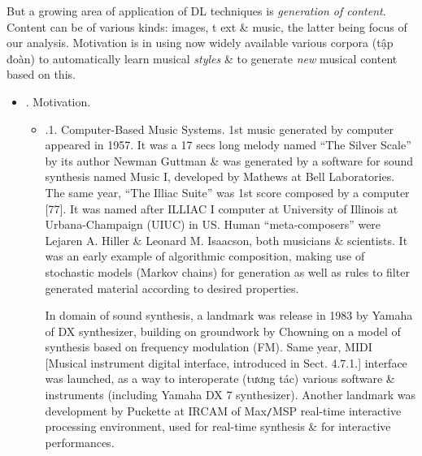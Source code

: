 \documentclass{article}
\begin{document}
\begin{itemize}
	But a growing area of application of DL techniques is {\it generation of content}. Content can be of various kinds: images, t ext \& music, the latter being focus of our analysis. Motivation is in using now widely available various corpora (tập đoàn) to automatically learn musical {\it styles} \& to generate {\it new} musical content based on this.
	\begin{itemize}
		\item {. Motivation.}
		\begin{itemize}
			\item {.1. Computer-Based Music Systems.} 1st music generated by computer appeared in 1957. It was a 17 secs long melody named ``The Silver Scale'' by its author {\sc Newman Guttman} \& was generated by a software for sound synthesis named Music I, developed by {\sc Mathews} at Bell Laboratories. The same year, ``The Illiac Suite'' was 1st score composed by a computer [77]. It was named after ILLIAC I computer at University of Illinois at Urbana-Champaign (UIUC) in US. Human ``meta-composers'' were {\sc Lejaren A. Hiller \& Leonard M. Isaacson}, both musicians \& scientists. It was an early example of algorithmic composition, making use of stochastic models (Markov chains) for generation as well as rules to filter generated material according to desired properties.

			In domain of sound synthesis, a landmark was release in 1983 by Yamaha of DX synthesizer, building on groundwork by {\sc Chowning} on a model of synthesis based on frequency modulation (FM). Same year, MIDI [Musical instrument digital interface, introduced in Sect. 4.7.1.] interface was launched, as a way to interoperate (tương tác) various software \& instruments (including Yamaha DX 7 synthesizer). Another landmark was development by {\sc Puckette} at IRCAM of Max{\tt/}MSP real-time interactive processing environment, used for real-time synthesis \& for interactive performances.


\end{itemize}
\end{itemize}
\end{itemize}
\end{document}

